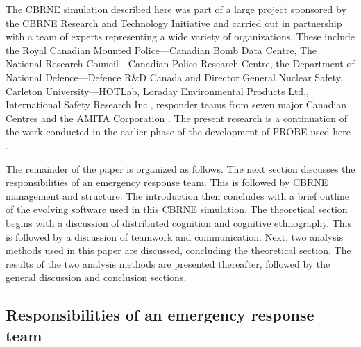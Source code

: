 \documentclass[link]{IWCOMP}
\begin{document}
The CBRNE simulation described here was part of a large project sponsored by
the CBRNE Research and Technology Initiative and carried out in partnership
with a team of experts representing a wide variety of organizations. These
include the Royal Canadian Mounted Police---Canadian Bomb Data Centre, The
National Research Council---Canadian Police Research Centre, the Department
of National Defence---Defence R{\&}D Canada and Director General Nuclear
Safety, Carleton University---HOTLab, Loraday Environmental Products Ltd.,
International Safety Research Inc., responder teams from seven major
Canadian Centres and the AMITA Corporation \citep{bib1}. The present
research is a continuation of the work conducted in the earlier phase of the
development of PROBE used here \citep{bib22}.

The remainder of the paper is organized as follows. The next section
discusses the responsibilities of an emergency response team. This is
followed by CBRNE management and structure. The introduction then concludes
with a brief outline of the evolving software used in this CBRNE simulation.
The theoretical section begins with a discussion of distributed cognition
and cognitive ethnography. This is followed by a discussion of teamwork and
communication. Next, two analysis methods used in this paper are discussed,
concluding the theoretical section. The results of the two analysis methods
are presented thereafter, followed by the general discussion and conclusion
sections.

\subsection{Responsibilities of an emergency response team}\label{subsec1.1}
\end{document}
